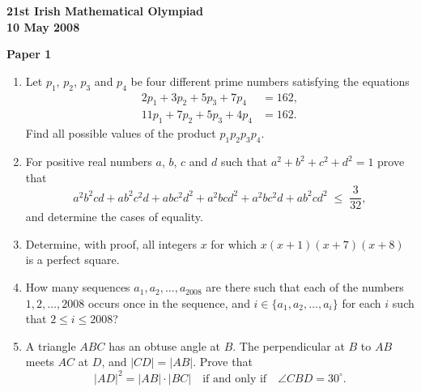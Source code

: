 \documentclass[12pt]{article}
\begin{document}
\begin{center}
{\large\bfseries 21st Irish Mathematical Olympiad\\10 May 2008}
\end{center}
\bigskip\noindent\textbf{Paper 1}\bigskip
\begin{enumerate}
\item Let $p_1$, $p_2$, $p_3$ and $p_4$ be four different prime numbers satisfying the equations
\begin{align*}
2p_1 + 3p_2 + 5p_3 + 7p_4 &= 162,\\
11p_1 + 7p_2 + 5p_3 + 4p_4 &= 162.
\end{align*}
Find all possible values of the product $p_1 p_2 p_3 p_4$.

\item For positive real numbers $a$, $b$, $c$ and $d$ such that $a^2 + b^2 + c^2 + d^2 = 1$ prove that
\[
a^2 b^2 cd + ab^2 c^2 d + abc^2 d^2 + a^2 bcd^2 + a^2 bc^2 d + ab^2 cd^2 \;\le\; \frac{3}{32},
\]
and determine the cases of equality.

\item Determine, with proof, all integers $x$ for which $x(x+1)(x+7)(x+8)$ is a perfect square.

\item How many sequences $a_1, a_2, \ldots, a_{2008}$ are there such that each of the numbers $1, 2, \ldots, 2008$ occurs once in the sequence, and $i \in \{a_1, a_2, \ldots, a_i\}$ for each $i$ such that $2 \le i \le 2008$?

\item A triangle $ABC$ has an obtuse angle at $B$. The perpendicular at $B$ to $AB$ meets $AC$ at $D$, and $|CD| = |AB|$. Prove that
\[
|AD|^2 = |AB|\cdot|BC| \quad \text{if and only if} \quad \angle CBD = 30^\circ.
\]
\end{enumerate}
\end{document}
